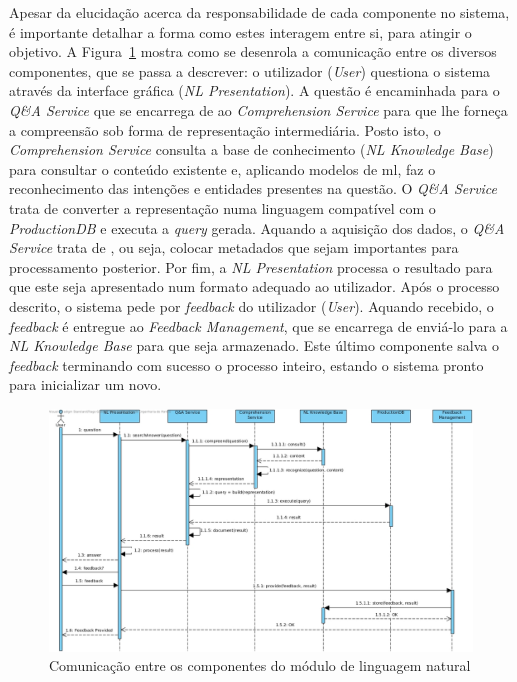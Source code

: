 Apesar da elucidação acerca da responsabilidade de cada componente no sistema, é importante detalhar a forma como estes interagem entre si, para atingir o objetivo. A Figura~\ref{fig:prototype_sequence_diagram} mostra como se desenrola a comunicação entre os diversos componentes, que se passa a descrever: o utilizador (\textit{User}) questiona o sistema através da interface gráfica (\textit{NL Presentation}). A questão é encaminhada para o \textit{Q\&A Service} que se encarrega de  ao \textit{Comprehension Service} para que lhe forneça a compreensão sob forma de representação intermediária. Posto isto, o \textit{Comprehension Service} consulta a base de conhecimento (\textit{NL Knowledge Base}) para consultar o conteúdo existente e, aplicando modelos de \gls{ml}, faz o reconhecimento das intenções e entidades presentes na questão. O \textit{Q\&A Service} trata de converter a representação numa linguagem compatível com o \textit{ProductionDB} e executa a \textit{query} gerada. Aquando a aquisição dos dados, o \textit{Q\&A Service} trata de , ou seja, colocar metadados que sejam importantes para processamento posterior. Por fim, a \textit{NL Presentation} processa o resultado para que este seja apresentado num formato adequado ao utilizador. Após o processo descrito, o sistema pede por \textit{feedback} do utilizador (\textit{User}). Aquando recebido, o \textit{feedback} é entregue ao \textit{Feedback Management}, que se encarrega de enviá-lo para a \textit{NL Knowledge Base} para que seja armazenado. Este último componente salva o \textit{feedback} terminando com sucesso o processo inteiro, estando o sistema pronto para inicializar um novo.

\begin{figure}
    \centering
    \includegraphics[width=\textwidth]{ch04/assets/workflow.jpg}
    \caption{Comunicação entre os componentes do módulo de linguagem natural}
    \label{fig:prototype_sequence_diagram}
\end{figure}

